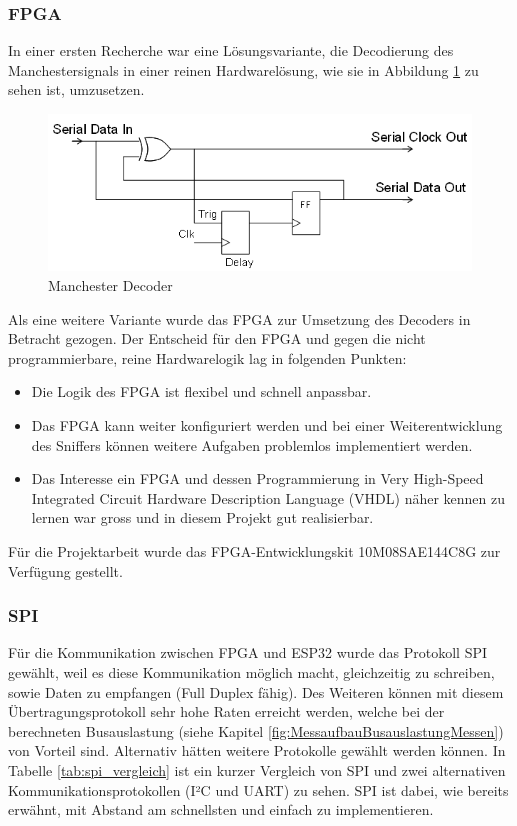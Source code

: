 \subsubsection{FPGA}
In einer ersten Recherche war eine Lösungsvariante, die Decodierung des Manchestersignals in einer reinen Hardwarelösung, wie sie in Abbildung \ref{fig:Manchester Decoder} zu sehen ist, umzusetzen.

\begin{figure}[H]
    \centering
    \includegraphics[width=0.6\linewidth]{Figures/Chap3/Design Eigener Sniffer/manchester_decoder.png}
    \caption{Manchester Decoder \cite{Manchester_Decoding}}
    \label{fig:Manchester Decoder}
\end{figure}

Als eine weitere Variante wurde das FPGA zur Umsetzung des Decoders in Betracht gezogen.
Der Entscheid für den FPGA und gegen die nicht programmierbare, reine Hardwarelogik lag in folgenden Punkten:
\begin{itemize}
  \item Die Logik des FPGA ist flexibel und schnell anpassbar.
  \item Das FPGA kann weiter konfiguriert werden und bei einer Weiterentwicklung des Sniffers können weitere Aufgaben problemlos implementiert werden.
  \item Das Interesse ein FPGA und dessen Programmierung in Very High-Speed Integrated Circuit Hardware Description Language (VHDL) näher kennen zu lernen war gross und in diesem Projekt gut realisierbar.
\end{itemize}

Für die Projektarbeit wurde das FPGA-Entwicklungskit 10M08SAE144C8G zur Verfügung gestellt.

\subsubsection{SPI}
Für die Kommunikation zwischen FPGA und ESP32 wurde das Protokoll SPI gewählt, weil es diese Kommunikation möglich macht, gleichzeitig zu schreiben, sowie Daten zu empfangen (Full Duplex fähig). Des Weiteren können mit diesem Übertragungsprotokoll sehr hohe Raten erreicht werden, welche bei der berechneten Busauslastung (siehe Kapitel \ref{fig:MessaufbauBusauslastungMessen}) von Vorteil sind. Alternativ hätten weitere Protokolle gewählt werden können. In Tabelle \ref{tab:spi_vergleich} ist ein kurzer Vergleich von SPI und zwei alternativen Kommunikationsprotokollen (I²C und UART) zu sehen. SPI ist dabei, wie bereits erwähnt, mit Abstand am schnellsten und einfach zu implementieren. \cite{SPI}

